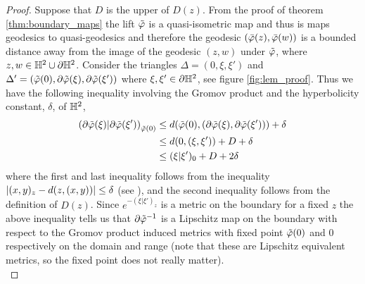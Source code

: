 \begin{proof}
  Suppose that $D$ is the upper of $D(z)$. From the proof of theorem \ref{thm:boundary_maps} the lift $\tilde{\varphi}$ is a quasi-isometric map and thus is maps geodesics to quasi-geodesics and therefore the geodesic $\left(\bar{\varphi}(z), \bar{\varphi}(w)\right)$ is a bounded distance away from the image of the geodesic $(z,w)$ under $\tilde{\varphi}$, where $z,w\in \mathbb{H}^2\cup {\partial \mathbb{H}^2}$. Consider the triangles $\Delta = (0, \xi, \xi')$ and $\Delta' = (\tilde{\varphi}(0), \partial\tilde{\varphi}(\xi), \partial\tilde{\varphi}(\xi'))$ where $\xi,\xi'\in {\partial \mathbb{H}^2}$, see figure \ref{fig:lem_proof}. Thus we have the following inequality involving the Gromov product and the hyperbolicity constant, $\delta$, of $\mathbb{H}^2$,
  \begin{align*}
    \left(\partial\tilde{\varphi}(\xi) | \partial\tilde{\varphi}(\xi')\right)_{\tilde{\varphi}(0)} &\leq d(\tilde{\varphi}(0), (\partial\tilde{\varphi}(\xi), \partial\tilde{\varphi}(\xi'))) + \delta\\  &\leq d(0, (\xi,\xi')) + D + \delta \\ &\leq (\xi | \xi')_0 + D + 2\delta
  \end{align*}
  where the first and last inequality follows from the inequality $\left|(x,y)_z - d(z,(x,y))\right|\leq \delta$ (see \cite{metric}), and the second inequality follows from the definition of $D(z)$. Since $e^{-(\xi|\xi')_z}$ is a metric on the boundary for a fixed $z$ the above inequality tells us that $\partial\tilde{\varphi}^{-1}$ is a Lipschitz map on the boundary with respect to the Gromov product induced metrics with fixed point $\tilde{\varphi}(0)$ and $0$ respectively on the domain and range (note that these are Lipschitz equivalent metrics, so the fixed point does not really matter).\\


\end{proof}
